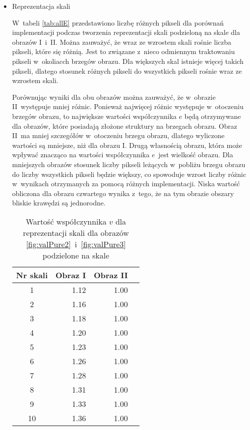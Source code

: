 \begin{itemize}
\item{Reprezentacja skali}
\label{subsubsec:reprezentacjaSakliTabele}

\nopagebreak
W~tabeli \ref{tab:allE} przedstawiono liczbę różnych pikseli dla porównań implementacji podczas tworzenia reprezentacji skali podzieloną na skale dla obrazów I~i~II. Można zauważyć, że wraz ze wzrostem skali rośnie liczba pikseli, które się różnią. Jest to związane z~nieco odmiennym traktowaniu pikseli w~okoliacch brzegów obrazu. Dla większych skal istnieje więcej takich pikseli, dlatego stosunek różnych pikseli do wszystkich pikseli rośnie wraz ze wzrostem skali.

Porównując wyniki dla obu obrazów można zauważyć, że w~obrazie II~występuje mniej różnic. Ponieważ najwięcej różnic występuje w~otoczeniu brzegów obrazu, to największe wartości współczynnika $ e $ będą otrzymywane dla obrazów, które posiadają złożone struktury na brzegach obrazu. Obraz II~ma mniej szczegółów w~otoczeniu brzegu obrazu, dlatego wyliczone wartości są mniejsze, niż dla obrazu I. Drugą własnością obrazu, która może wpływać znacząco na wartości współczynnika $ e $~jest wielkość obrazu. Dla mniejszych obrazów stosunek liczby pikseli leżących w~pobliżu brzegu obrazu do liczby wszystkich pikseli będzie większy, co spowoduje wzrost liczby różnic w~wynikach otrzymanych za pomocą różnych implementacji. Niska wartość obliczona dla obrazu czwartego wynika z~tego, że na tym obrazie obszary bliskie krawędzi są jednorodne.

\begin{center}
\begin{table}
\centering
\caption{Wartość współczynnika $ v $ dla reprezentacji skali dla obrazów \ref{fig:valPure2}~i~\ref{fig:valPure3} podzielone na skale}
\label{tab:allV}
\begin{tabular}{|c|r|r|r|}
\hline
Nr skali & Obraz I  &  Obraz II\\ \hline
1        & 1.12     & 1.00\\ \hline
2        & 1.16     & 1.00\\ \hline
3        & 1.18     & 1.00\\ \hline
4        & 1.20     & 1.00\\ \hline
5        & 1.23     & 1.00\\ \hline
6        & 1.26     & 1.00\\ \hline
7        & 1.28     & 1.00\\ \hline
8        & 1.31     & 1.00\\ \hline
9        & 1.33     & 1.00\\ \hline
10       & 1.36     & 1.00\\ \hline
\end{tabular}
\end{table}
\end{center}


\end{itemize}
